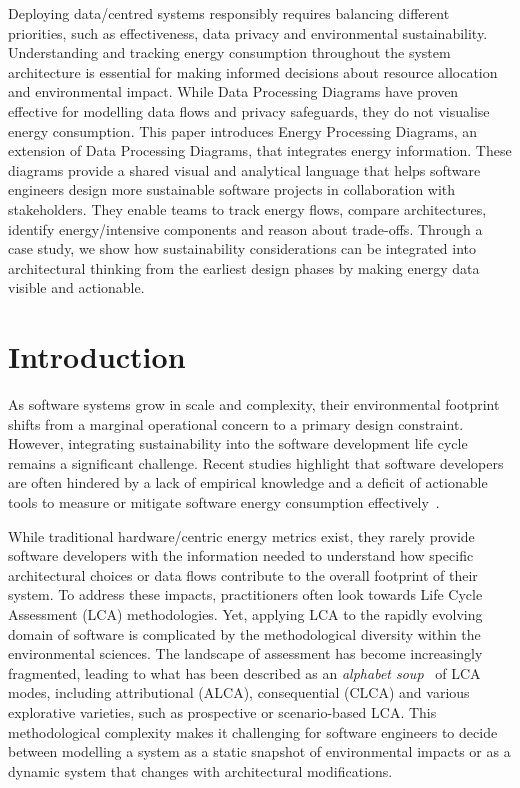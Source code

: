 Deploying data\-/centred systems responsibly requires balancing different priorities, such as effectiveness, data privacy and environmental sustainability.
Understanding and tracking energy consumption throughout the system architecture is essential for making informed decisions about resource allocation and environmental impact.
While Data Processing Diagrams have proven effective for modelling data flows and privacy safeguards, they do not visualise energy consumption.
This paper introduces Energy Processing Diagrams, an extension of Data Processing Diagrams, that integrates energy information.
These diagrams provide a shared visual and analytical language that helps software engineers design more sustainable software projects in collaboration with stakeholders.
They enable teams to track energy flows, compare architectures, identify energy\-/intensive components and reason about trade-offs.
Through a case study, we show how sustainability considerations can be integrated into architectural thinking from the earliest design phases by making energy data visible and actionable.

\section{Introduction}
As software systems grow in scale and complexity, their environmental footprint shifts from a marginal operational concern to a primary design constraint.
However, integrating sustainability into the software development life cycle remains a significant challenge.
Recent studies highlight that software developers are often hindered by a lack of empirical knowledge and a deficit of actionable tools to measure or mitigate software energy consumption effectively~\cite{pinto2017energy}.

While traditional hardware\-/centric energy metrics exist, they rarely provide software developers with the information needed to understand how specific architectural choices or data flows contribute to the overall footprint of their system.
To address these impacts, practitioners often look towards Life Cycle Assessment (LCA) methodologies.
Yet, applying LCA to the rapidly evolving domain of software is complicated by the methodological diversity within the environmental sciences.
The landscape of assessment has become increasingly fragmented, leading to what has been described as an \emph{alphabet soup}~\cite{guinee2018digesting} of LCA modes, including attributional (ALCA), consequential (CLCA) and various explorative varieties, such as prospective or scenario-based LCA.
This methodological complexity makes it challenging for software engineers to decide between modelling a system as a static snapshot of environmental impacts or as a dynamic system that changes with architectural modifications.

